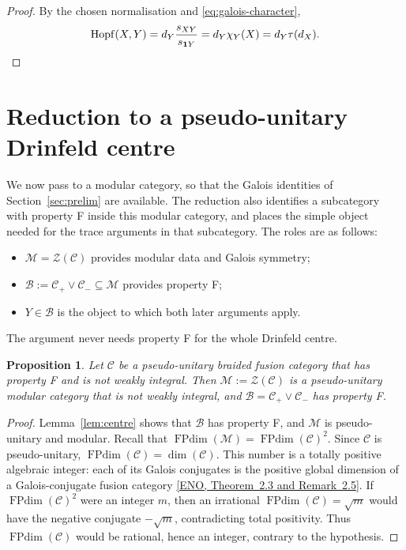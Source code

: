 \documentclass[11pt,oneside]{amsart}
\newtheorem{proposition}[theorem]{Proposition}
\theoremstyle{remark}
\newcommand{\C}{\mathcal C}
\newcommand{\M}{\mathcal M}
\newcommand{\one}{\mathbf 1}
\newcommand{\FP}{\operatorname{FPdim}}
\newcommand{\Hopf}{\operatorname{Hopf}}
\newcommand{\sourcecite}[3]{\nocite{#1}\href{#3}{[#1, #2]}}
\begin{document}
\begin{proof}
By the chosen normalisation and \eqref{eq:galois-character},
\[
\Hopf(X,Y)=d_Y\frac{s_{XY}}{s_{\one Y}}
=d_Y\chi_Y(X)=d_Y\tau(d_X).\qedhere
\]
\end{proof}

\section{Reduction to a pseudo-unitary Drinfeld centre}\label{sec:red}

We now pass to a modular category, so that the Galois identities of
Section~\ref{sec:prelim} are available. The reduction also identifies a
subcategory with property F inside this modular category, and places the simple
object needed for the trace arguments in that subcategory. The roles are as
follows:
\begin{itemize}
\item $\M=\mathcal Z(\C)$ provides modular data and Galois symmetry;
\item $\mathcal B:=\C_+\vee\C_-\subseteq\M$ provides property F;
\item $Y\in\mathcal B$ is the object to which both later arguments apply.
\end{itemize}
The argument never needs property F for the whole Drinfeld centre.

\begin{proposition}\label{prop:red}
Let $\C$ be a pseudo-unitary braided fusion category that has property F and is
not weakly integral. Then $\M:=\mathcal Z(\C)$ is a pseudo-unitary modular
category that is not weakly integral, and $\mathcal B=\C_+\vee\C_-$ has
property F.
\end{proposition}

\begin{proof}
Lemma~\ref{lem:centre} shows that $\mathcal B$ has property F, and $\M$ is
pseudo-unitary and modular. Recall that $\FP(\M)=\FP(\C)^2$. Since $\C$ is
pseudo-unitary, $\FP(\C)=\dim(\C)$. This number is a totally positive algebraic
integer: each of its Galois conjugates is the positive global dimension of a
Galois-conjugate fusion category
\sourcecite{ENO}{Theorem~2.3 and Remark~2.5}{https://annals.math.princeton.edu/wp-content/uploads/annals-v162-n2-p01.pdf\#page=5}.
If $\FP(\C)^2$ were an integer $m$, then an irrational $\FP(\C)=\sqrt m$ would
have the negative conjugate $-\sqrt m$, contradicting total positivity. Thus
$\FP(\C)$ would be rational, hence an integer, contrary to the hypothesis.
\end{proof}
\end{document}
